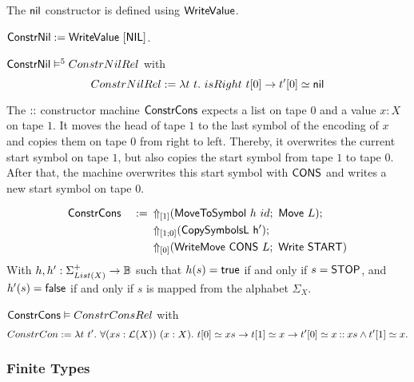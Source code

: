 The $\nil$ constructor is defined using $\MS{WriteValue}$.
\begin{definition}[$\MS{ConstrNil}$]
  $\MS{ConstrNil} := \MS{WriteValue}~[\MS{NIL}]$.
\end{definition}
\begin{lemma}
  $\MS{ConstrNil} \RealiseIn{5} ConstrNilRel$ with
  \[
    ConstrNilRel := \lambda t~t.~isRight~t[0] \rightarrow t'[0] \simeq \nil
  \]
\end{lemma}

The $\cons$ constructor machine $\MS{ConstrCons}$ expects a list on tape $0$ and a value $x:X$ on tape $1$.  It moves the head of tape $1$ to the last
symbol of the encoding of $x$ and copies them on tape $0$ from right to left.  Thereby, it overwrites the current start symbol on tape $1$, but also
copies the start symbol from tape $1$ to tape $0$.  After that, the machine overwrites this start symbol with $\MS{CONS}$ and writes a new start
symbol on tape $0$.

\begin{definition}[$\MS{ConstrCons}$]
  \label{def:Constr_cons}
  \begin{alignat*}{2}
    &\MS{ConstrCons}&~:=~& \LiftTapes{(\MS{MoveToSymbol}~h~id \Seq \MS{Move}~L)}{\Vector{1}} \Seq \\
    &               &    & \LiftTapes{(\MS{CopySymbolsL~h'})}{\Vector{1;0}} \Seq \\
    &               &    & \LiftTapes{(\MS{WriteMove}~\MS{CONS}~L \Seq \MS{Write}~\MS{START})}{\Vector{0}}
  \end{alignat*}
  With $h, h' : \Sigma_{List(X)}^+ \to \Bool$ such that $h(s)=\true$ if and only if $s=\MS{STOP}$, and $h'(s)=\false$ if and only if $s$ is mapped
  from the alphabet $\Sigma_X$.
\end{definition}

\begin{lemma}
  \label{lem:Constr_cons_Realise}
  $\MS{ConstrCons} \Realise ConstrConsRel$ with
  \[
    ConstrCon := \lambda t~t'.~\forall (xs:\List(X))~(x:X).~t[0] \simeq xs \rightarrow t[1] \simeq x \rightarrow t'[0] \simeq x \cons xs \land t'[1]
    \simeq x.
  \]
\end{lemma}


\subsubsection{Finite Types}


